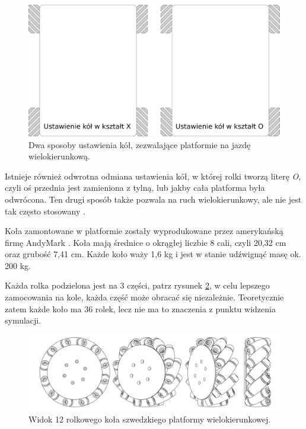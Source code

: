 	\begin{figure}[H]
	\centering
	\includegraphics[width=\textwidth]{graphics/bases.pdf}
	\caption{Dwa sposoby ustawienia kół, zezwalające platformie na jazdę wielokierunkową.}
	\label{fig:bases}
	\end{figure} 

	Istnieje również odwrotna odmiana ustawienia kół, w której rolki tworzą literę \emph{O}, 
	czyli oś przednia jest zamieniona z tylną, lub jakby cała platforma była odwrócona.
	Ten drugi sposób także pozwala na ruch wielokierunkowy, ale nie jest tak często stosowany \cite{paletobot}.
	
	Koła zamontowane w platformie zostały wyprodukowane przez amerykańską firmę AndyMark \cite{andymark}.
	Koła mają średnice o okrągłej liczbie 8 cali, czyli 20,32 \si{\centi\metre} oraz grubość 7,41 \si{\centi\metre}.
	Każde koło waży 1,6 \si{\kilo\gram} i jest w stanie udźwignąć masę ok. 200 \si{\kilo\gram}.
	
	Każda rolka podzielona jest na 3 części, patrz rysunek \ref{fig:wheel}, w celu lepszego zamocowania na kole, każda część może obracać się niezależnie.
	Teoretycznie zatem każde koło ma 36 rolek, lecz nie ma to znaczenia z punktu widzenia symulacji.

	\begin{figure}[H]
	\centering
	\includegraphics[width=\textwidth]{graphics/wheel.pdf}
	\caption{Widok 12 rolkowego koła szwedzkiego platformy wielokierunkowej.}
	\label{fig:wheel}
	\end{figure} 

